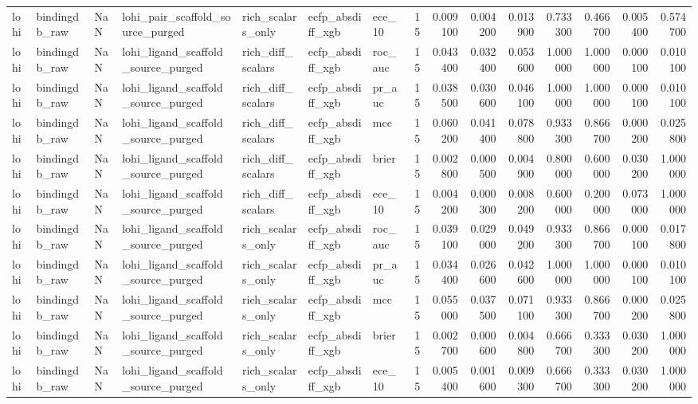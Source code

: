 \begin{longtable}{lllllllrrrrrrrr}
lohi & bindingdb\_raw & NaN & lohi\_pair\_scaffold\_source\_purged & rich\_scalars\_only & ecfp\_absdiff\_xgb & ece\_10 & 15 & 0.009100 & 0.004200 & 0.013900 & 0.733300 & 0.466700 & 0.005400 & 0.574700 \\
lohi & bindingdb\_raw & NaN & lohi\_ligand\_scaffold\_source\_purged & rich\_diff\_scalars & ecfp\_absdiff\_xgb & roc\_auc & 15 & 0.043400 & 0.032400 & 0.053600 & 1.000000 & 1.000000 & 0.000100 & 0.010100 \\
lohi & bindingdb\_raw & NaN & lohi\_ligand\_scaffold\_source\_purged & rich\_diff\_scalars & ecfp\_absdiff\_xgb & pr\_auc & 15 & 0.038500 & 0.030600 & 0.046100 & 1.000000 & 1.000000 & 0.000100 & 0.010100 \\
lohi & bindingdb\_raw & NaN & lohi\_ligand\_scaffold\_source\_purged & rich\_diff\_scalars & ecfp\_absdiff\_xgb & mcc & 15 & 0.060200 & 0.041400 & 0.078800 & 0.933300 & 0.866700 & 0.000200 & 0.025800 \\
lohi & bindingdb\_raw & NaN & lohi\_ligand\_scaffold\_source\_purged & rich\_diff\_scalars & ecfp\_absdiff\_xgb & brier & 15 & 0.002800 & 0.000500 & 0.004900 & 0.800000 & 0.600000 & 0.030200 & 1.000000 \\
lohi & bindingdb\_raw & NaN & lohi\_ligand\_scaffold\_source\_purged & rich\_diff\_scalars & ecfp\_absdiff\_xgb & ece\_10 & 15 & 0.004200 & 0.000300 & 0.008200 & 0.600000 & 0.200000 & 0.073000 & 1.000000 \\
lohi & bindingdb\_raw & NaN & lohi\_ligand\_scaffold\_source\_purged & rich\_scalars\_only & ecfp\_absdiff\_xgb & roc\_auc & 15 & 0.039100 & 0.029000 & 0.049200 & 0.933300 & 0.866700 & 0.000100 & 0.017800 \\
lohi & bindingdb\_raw & NaN & lohi\_ligand\_scaffold\_source\_purged & rich\_scalars\_only & ecfp\_absdiff\_xgb & pr\_auc & 15 & 0.034400 & 0.026600 & 0.042600 & 1.000000 & 1.000000 & 0.000100 & 0.010100 \\
lohi & bindingdb\_raw & NaN & lohi\_ligand\_scaffold\_source\_purged & rich\_scalars\_only & ecfp\_absdiff\_xgb & mcc & 15 & 0.055000 & 0.037500 & 0.071100 & 0.933300 & 0.866700 & 0.000200 & 0.025800 \\
lohi & bindingdb\_raw & NaN & lohi\_ligand\_scaffold\_source\_purged & rich\_scalars\_only & ecfp\_absdiff\_xgb & brier & 15 & 0.002700 & 0.000600 & 0.004800 & 0.666700 & 0.333300 & 0.030200 & 1.000000 \\
lohi & bindingdb\_raw & NaN & lohi\_ligand\_scaffold\_source\_purged & rich\_scalars\_only & ecfp\_absdiff\_xgb & ece\_10 & 15 & 0.005400 & 0.001600 & 0.009300 & 0.666700 & 0.333300 & 0.030200 & 1.000000 \\

\end{longtable}
